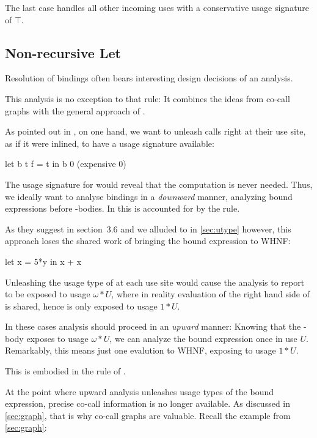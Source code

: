 The last case handles all other incoming uses with a conservative usage signature of $\top$.

\subsection{Non-recursive Let}\label{sec:let}

Resolution of  bindings often bears interesting design decisions of an analysis.

This analysis is no exception to that rule:
It combines the ideas from co-call graphs \parencite{callarity} with the general approach of \textcite{card}.

As pointed out in \textcite[section~3.5]{card}, on one hand, we want to unleash calls right at their use site, as if it were inlined, to have a usage signature available:

\begin{haskellcode}
  let b t f = t
  in b 0 (expensive 0)
\end{haskellcode}

The usage signature for  would reveal that the  computation is never needed.
Thus, we ideally want to analyse  bindings in a \emph{downward} manner, analyzing bound expressions before -bodies.
In \textcite{card} this is accounted for by the  rule.

As they suggest in section~3.6 and we alluded to in \cref{sec:utype} however, this approach loses the shared work of bringing the bound expression to WHNF:

\begin{haskellcode}
let x = 5*y
in x + x
\end{haskellcode}

Unleashing the usage type of  at each use site would cause the analysis to report  to be exposed to usage $\omega*U$, where in reality evaluation of the right hand side of  is shared, hence  is only exposed to usage $1*U$.

In these cases analysis should proceed in an \emph{upward} manner: 
Knowing that the -body exposes  to usage $\omega*U$, we can analyze the bound expression once in use $U$. 
Remarkably, this means just one evalution to WHNF, exposing  to usage $1*U$.

This is embodied in the  rule of \textcite{card}.

At the point where upward analysis unleashes usage types of the bound expression, precise co-call information is no longer available.
As discussed in \cref{sec:graph}, that is why co-call graphs are valuable. Recall the example from \cref{sec:graph}:

